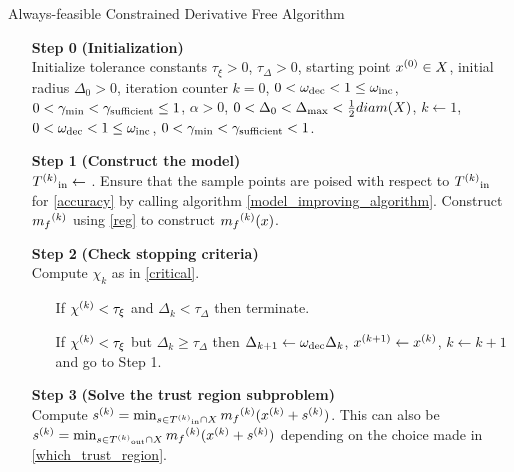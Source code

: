 \begin{algorithm}[H]
    \caption{Always-feasible Constrained Derivative Free Algorithm}
    \label{constrained_dfo}
    \begin{itemize}
        \item[\textbf{Step 0}] \textbf{(Initialization)} \\
            Initialize tolerance constants 
            $\tau_{\xi} > 0$,
            $\tau_{\Delta} > 0$,
            starting point $x^{(0)} \in X$,
            initial radius $\Delta_0 > 0$,
            iteration counter $k=0$,
            $0 < \omega_{\text{dec}} < 1 \le \omega_{\text{inc}}$,
            $0 < \gamma_{\text{min}} < \gamma_{\text{sufficient}} \le 1$,
            $\alpha > 0$,
            $0 < \Delta_0 < \Delta_{\text{max}} < \frac 1 2 diam(X)$,
            $k \gets 1$,
            $0 < \omega_{\text{dec}} < 1 \le \omega_{\text{inc}}$,
            $0 < \gamma_{\text{min}} < \gamma_{\text{sufficient}} < 1$.
            
        \item[\textbf{Step 1}] \textbf{(Construct the model)} \\
            ${T^{(k)}}_{\text{in}}\gets $ .
            Ensure that the sample points are poised with respect to ${T^{(k)}}_{\text{in}}$ for \ref{accuracy} by calling algorithm \ref{model_improving_algorithm}.
            Construct ${{m}_f}^{(k)}$ using \ref{reg} to construct ${{m}_f}^{(k)}(x)$.
        
        \item[\textbf{Step 2}] \textbf{(Check stopping criteria)} \\
            Compute $\chi_k$ as in \ref{critical}. \begin{itemize}
                \item[] If $ {\chi^{(k)}} < \tau_{\xi} $ and $\Delta_k<\tau_{\Delta}$ then terminate.
                \item[] If $ {\chi^{(k)}} < \tau_{\xi} $ but $\Delta_k\ge\tau_{\Delta}$ then 
                $\Delta_{k+1} \gets \omega_{\text{dec}}\Delta_{k}$, 
                $x^{(k+1)} \gets {x}^{(k)}$,
                $k \gets k+1$ and go to Step 1.
            \end{itemize}
        
        \item[\textbf{Step 3}] \textbf{(Solve the trust region subproblem)} \\
            Compute ${s}^{(k)} = \min_{s \in {T^{(k)}}_{\text{in}} \cap X} {{m}_f}^{(k)}({x}^{(k)} + {s}^{(k)})$.
            This can also be ${s}^{(k)} = \min_{s \in {T^{(k)}}_{\text{out}} \cap X} {{m}_f}^{(k)}({x}^{(k)} + {s}^{(k)})$ depending on the choice made in \ref{which_trust_region}.
            

\end{itemize}
\end{algorithm}
